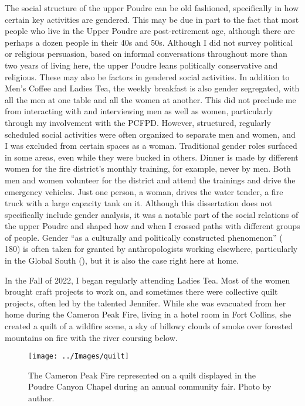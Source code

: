 \documentclass[
]{article}
\begin{document}
The social structure of the upper Poudre can be old fashioned, specifically in how certain key activities are gendered. This may be due in part to the fact that most people who live in the Upper Poudre are post-retirement age, although there are perhaps a dozen people in their 40s and 50s. Although I did not survey political or religious persuasion, based on informal conversations throughout more than two years of living here, the upper Poudre leans politically conservative and religious. These may also be factors in gendered social activities. In addition to Men's Coffee and Ladies Tea, the weekly breakfast is also gender segregated, with all the men at one table and all the women at another. This did not preclude me from interacting with and interviewing men as well as women, particularly through my involvement with the PCFPD. However, structured, regularly scheduled social activities were often organized to separate men and women, and I was excluded from certain spaces as a woman. Traditional gender roles surfaced in some areas, even while they were bucked in others. Dinner is made by different women for the fire district's monthly training, for example, never by men. Both men and women volunteer for the district and attend the trainings and drive the emergency vehicles. Just one person, a woman, drives the water tender, a fire truck with a large capacity tank on it. Although this dissertation does not specifically include gender analysis, it was a notable part of the social relations of the upper Poudre and shaped how and when I crossed paths with different groups of people. Gender ``as a culturally and politically constructed phenomenon'' ( 180) is often taken for granted by anthropologists working elsewhere, particularly in the Global South (), but it is also the case right here at home.

In the Fall of 2022, I began regularly attending Ladies Tea. Most of the women brought craft projects to work on, and sometimes there were collective quilt projects, often led by the talented Jennifer. While she was evacuated from her home during the Cameron Peak Fire, living in a hotel room in Fort Collins, she created a quilt of a wildfire scene, a sky of billowy clouds of smoke over forested mountains on fire with the river coursing below.

\begin{figure}
\texttt{[image: ../Images/quilt]} \caption[Cameron Peak Fire quilt]{The Cameron Peak Fire represented on a quilt displayed in the Poudre Canyon Chapel during an annual community fair. Photo by author.}\label{fig:figureTitle8}
\end{figure}
\end{document}
